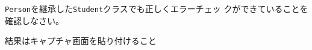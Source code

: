  \begin{Prob}\upshape
  \texttt{Person}を継承した\texttt{Student}クラスでも正しくエラーチェッ
  クができていることを確認しなさい。
\end{Prob}
\ifText 結果はキャプチャ画面を貼り付けること\vspace{0.3\textheight}\fi